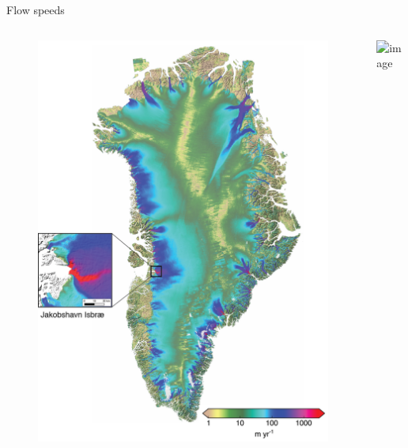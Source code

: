 \documentclass[hide notes,intlimits]{beamer}
\begin{document}
\begin{frame}{Flow speeds}
\vspace{-0.74em}
  \begin{columns}
    \column[c]{5cm}
    \begin{figure}
      \includegraphics[width=\textwidth]{greenland-obs-overview}
    \end{figure}
    \column[c]{5cm}
    \includegraphics<1>[width=\textwidth]{jakobshavn-obs-nogate}
  \end{columns}
\end{frame}
\end{document}
